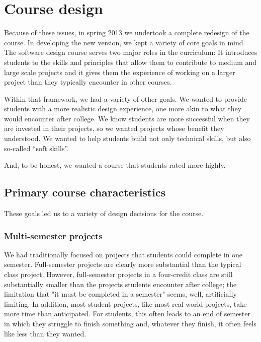 \section{Course design}

Because of these issues, in spring 2013 we undertook a complete
redesign of the course.  In developing the new version, we kept a
variety of core goals in mind.  The software design course serves
two major roles in the curriculum: It introduces students to the
skills and principles that allow them to contribute to medium and
large scale projects and it gives them the experience of working
on a larger project than they typically encounter in other courses.

Within that framework, we had a variety of other goals.  We wanted
to provide students with a more realistic design experience, one more
akin to what they would encounter after college.  We know students
are more successful when they are invested in their projects, so we
wanted projects whose benefit they understood.  We wanted to help
students build not only technical skills, but also so-called ``soft
skills''.  

And, to be honest, we wanted a course that students rated more highly.

\subsection{Primary course characteristics}

These goals led us to a variety of design decisions for the course.

\subsubsection{Multi-semester projects}

We had traditionally focused on projects that students could complete
in one semester.  Full-semester projects are clearly more substantial
than the typical class project.  However, full-semester projects
in a four-credit class are still substantially smaller than the
projects students encounter after college; the limitation that "it
must be completed in a semester" seems, well, artificially limiting.
In addition, most student projects, like most real-world projects,
take more time than anticipated.  For students, this often leads
to an end of semester in which they struggle to finish something
and, whatever they finish, it often feels like less than they wanted.

